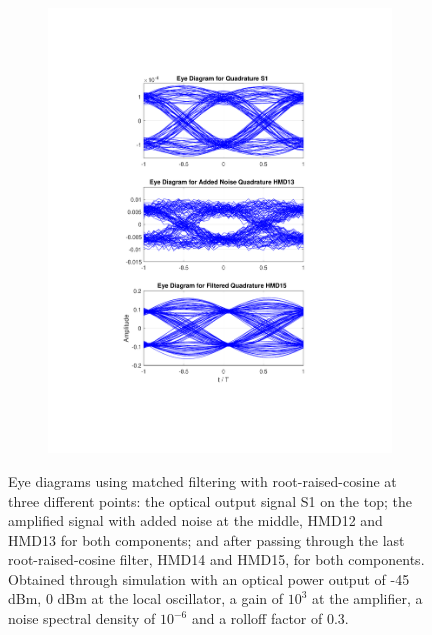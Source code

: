 \begin{figure}[H]
\begin{subfigure}{.45\textwidth}
		\includegraphics[clip, trim=5cm 4cm 5cm 4cm, width=\textwidth]{./sdf/m_qam_system/figures/eyes/q_p_45_03.pdf}
	\end{subfigure}
	
	\caption{Eye diagrams using matched filtering with root-raised-cosine at three different points: the optical output signal S1 on the top; the amplified signal with added noise at the middle, HMD12 and HMD13 for both components; and after passing through the last root-raised-cosine filter, HMD14 and HMD15, for both components. Obtained through simulation with an optical power output of -45 dBm, 0 dBm at the local oscillator, a gain of $10^3$ at the amplifier, a noise spectral density of $10^{-6}$ and a rolloff factor of 0.3.\label{fig:eyes_n_rrc_45_03}}
	
\end{figure}

